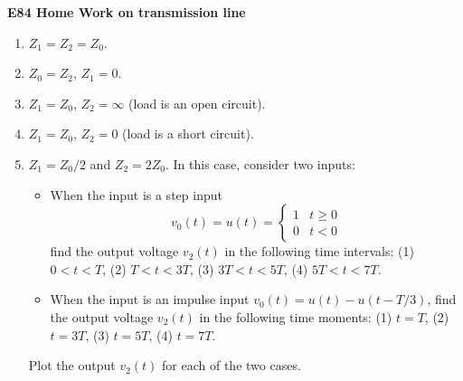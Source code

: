 \usepackage{html}

\begin{center}
{\Large \bf E84 Home Work on transmission line}
\end{center}
\begin{enumerate}

A voltage source $v_0(t)$ with internal impedance $Z_1$ is connected to a load
$Z_2$ by a transmission line with $Z_0$. Find $A$, $\eta_1$, $\eta_2$, $T_1$, 
$T_2$, $Z_{in}$, and $Z_{out}$, for each of the following cases. Also, for a 
given input $v_0(t)$, find the voltages $v_1(t)$ and $v_2(t)$.  

\item $Z_1=Z_2=Z_0$. 

\item $Z_0=Z_2$, $Z_1=0$.

\item $Z_1=Z_0$, $Z_2=\infty$ (load is an open circuit).

\item $Z_1=Z_0$, $Z_2=0$ (load is a short circuit). 

\item $Z_1=Z_0/2$ and $Z_2=2Z_0$. In this case, consider two inputs:
  \begin{itemize}
  \item When the input is a step input 
    \[ v_0(t)=u(t)=\left\{\begin{array}{ll}1 & t\ge 0\\0 & t<0\end{array}\right.\]
    find the output voltage $v_2(t)$ in the following time intervals:
    (1) $0<t<T$, (2) $T<t<3T$, (3) $3T<t<5T$, (4) $5T<t<7T$.
  \item When the input is an impulse input $v_0(t)=u(t)-u(t-T/3)$,
    find the output voltage $v_2(t)$ in the following time moments:
    (1) $t=T$, (2) $t=3T$, (3) $t=5T$, (4) $t=7T$.    
  \end{itemize}
  Plot the output $v_2(t)$ for each of the two cases.

\end{enumerate}


